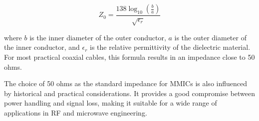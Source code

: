 \[
Z_0 = \frac{138 \log_{10}(\frac{b}{a})}{\sqrt{\epsilon_r}}
\]

where \( b \) is the inner diameter of the outer conductor, \( a \) is the outer diameter of the inner conductor, and \( \epsilon_r \) is the relative permittivity of the dielectric material. For most practical coaxial cables, this formula results in an impedance close to 50 ohms.

The choice of 50 ohms as the standard impedance for MMICs is also influenced by historical and practical considerations. It provides a good compromise between power handling and signal loss, making it suitable for a wide range of applications in RF and microwave engineering.

